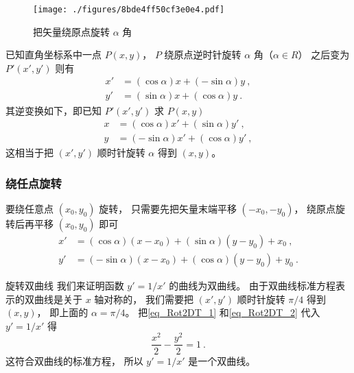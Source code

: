 
\begin{issues}
\issueDraft
\end{issues}



\begin{figure}[ht]
\centering
\texttt{[image: ./figures/8bde4ff50cf3e0e4.pdf]}
\caption{把矢量绕原点旋转 $\alpha$ 角} \label{fig_Rot2DT_1}
\end{figure}

已知直角坐标系中一点 $P(x,y)$， $P$ 绕原点逆时针旋转 $\alpha $ 角（$\alpha  \in R$） 之后变为 $P'(x',y')$ 则有
\begin{align}\label{eq_Rot2DT_1}
x' &= (\cos \alpha)x + (- \sin \alpha)y ~,\\
\label{eq_Rot2DT_2}
y' &= (\sin \alpha)x + (\cos \alpha)y~.
\end{align}
其逆变换如下，即已知 $P'(x',y')$ 求 $P(x,y)$ 
\begin{align}\label{eq_Rot2DT_3}
x &= ( \cos \alpha  )x' + ( \sin \alpha  )y' ~,\\
\label{eq_Rot2DT_4}
y &= ( - \sin \alpha)x' + ( \cos \alpha )y'~,
\end{align}
这相当于把 $(x', y')$ 顺时针旋转 $\alpha$ 得到 $(x, y)$。

\subsubsection{绕任点旋转}
要绕任意点 $(x_0, y_0)$ 旋转， 只需要先把矢量末端平移 $(-x_0, -y_0)$， 绕原点旋转后再平移 $(x_0, y_0)$ 即可
\begin{equation}\label{eq_Rot2DT_5}
\begin{aligned}
x' &= ( \cos \alpha  )(x-x_0) + ( \sin \alpha  )(y-y_0) + x_0 ~,\\
y' &= ( - \sin \alpha)(x-x_0) + ( \cos \alpha )(y-y_0) + y_0~.
\end{aligned}
\end{equation}

\begin{example}{旋转双曲线}
我们来证明函数 $y' = 1/x'$ 的曲线为双曲线。 由于双曲线标准方程表示的双曲线是关于 $x$ 轴对称的， 我们需要把 $(x', y')$ 顺时针旋转 $\pi/4$ 得到 $(x, y)$， 即上面的 $\alpha = \pi/4$。 把\autoref{eq_Rot2DT_1} 和\autoref{eq_Rot2DT_2} 代入 $y' = 1/x'$ 得
\begin{equation}
\frac{x^2}{2} - \frac{y^2}{2} = 1~.
\end{equation}
这符合双曲线的标准方程， 所以 $y' = 1/x'$ 是一个双曲线。
\end{example}

